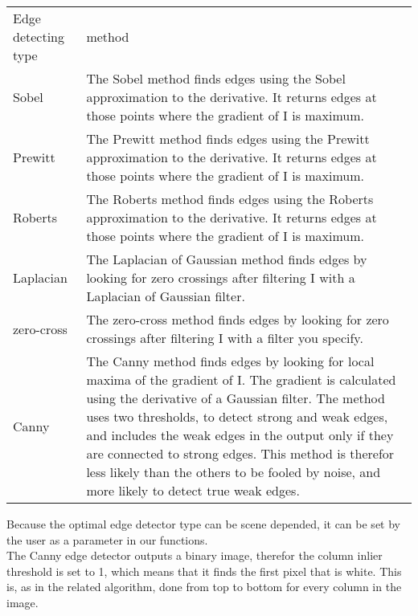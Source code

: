 
\begin{tabular}{|l|l|}
	\hline
	Edge detecting type		& method\\
	Sobel					& The Sobel method finds edges using the Sobel
	approximation to the derivative. It returns edges at those points where the
	gradient of I is maximum.\\
	\hline
	Prewitt					& The Prewitt method finds edges using the Prewitt
	approximation to the derivative. It returns edges at those points where the
	gradient of I is maximum.\\
	\hline
	Roberts					& The Roberts method finds edges using the Roberts
	approximation to the derivative. It returns edges at those points where the
	gradient of I is maximum.\\
	\hline
	Laplacian				& The Laplacian of Gaussian method finds edges by
	looking for zero crossings after filtering I with a Laplacian of Gaussian
	filter.\\
	\hline
	zero-cross				& The zero-cross method finds edges by looking for zero
	crossings after filtering I with a filter you specify.\\
	\hline
	Canny					& The Canny method finds edges by looking for local
	maxima of the gradient of I. The gradient is calculated using the derivative of
	a Gaussian filter. The method uses two thresholds, to detect strong and weak
	edges, and includes the weak edges in the output only if they are connected to
	strong edges. This method is therefor less likely than the others to be fooled
	by noise, and more likely to detect true weak edges.\\
	\hline
\end{tabular}

Because the optimal edge detector type can be scene depended, it can be set
by the user as a parameter in our functions.\\

The Canny edge detector outputs a binary image, therefor the column inlier
threshold is set to 1, which means that it finds the first pixel that is white. 
This is, as in the related algorithm, done from top to bottom for every column in
the image.\\

